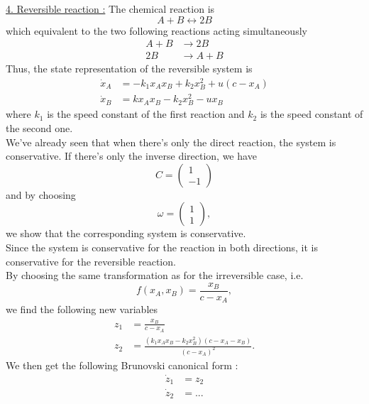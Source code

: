 \underline{4. Reversible reaction :}
The chemical reaction is $$A + B \longleftrightarrow 2B$$ which equivalent to the two following reactions acting simultaneously
\begin{align*}
A + B & \longrightarrow 2B\\
2B & \longrightarrow A+B
\end{align*}
Thus, the state representation of the reversible system is
\begin{align*}
\dot{x}_A & = -k_1 x_A x_B + k_2 x_B^2 + u(c-x_A)\\
\dot{x}_B & = k x_A x_B - k_2 x_B^2 - ux_B
\end{align*}
where $k_1$ is the speed constant of the first reaction and $k_2$ is the speed constant of the second one.\\
We've already seen that when there's only the direct reaction, the system is conservative. If there's only the inverse direction, we have 
$$C = 
\begin{pmatrix}
1\\
-1
\end{pmatrix}$$ and by choosing
$$\omega =
\begin{pmatrix}
1\\
1
\end{pmatrix},$$ we show that the corresponding system is conservative.\\
Since the system is conservative for the reaction in both directions, it is conservative for the reversible reaction.\\
By choosing the same transformation as for the irreversible case, i.e. $$f(x_A,x_B) = \frac{x_B}{c-x_A},$$ we find the following new variables
\begin{align*}
z_1 & = \frac{x_B}{c-x_A}\\
z_2 & = \frac{(k_1x_Ax_B-k_2x_B^2)(c-x_A-x_B)}{(c-x_A)^2}.
\end{align*} 
We then get the following Brunovski canonical form :
\begin{align*}
\dot{z}_1 & = z_2\\
\dot{z}_2 & = ...
\end{align*}

